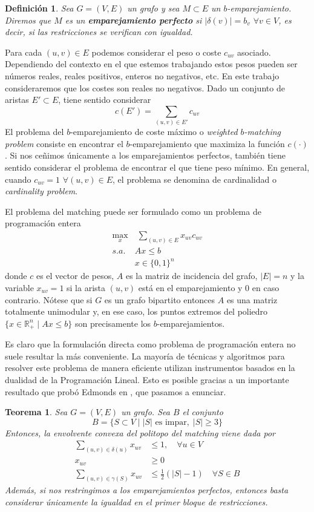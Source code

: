 \documentclass[twoside,a4paper,openright,12pt]{book}
\newtheorem{defi}{Definici\'on}[section]
\newtheorem{thm}{Teorema}[section]
\newcommand{\R}{\mathbb{R}}
\begin{document}
\begin{defi}
Sea $G=(V,E)$ un grafo y sea $M\subset E$ un $b$-emparejamiento. Diremos que $M$ es un \textbf{emparejamiento perfecto} si $|\delta(v)|=b_v$ $\forall v \in V$, es decir, si las restricciones se verifican con igualdad.
\end{defi}
Para cada $(u,v)\in E$ podemos considerar el peso o coste $c_{uv}$ asociado. Dependiendo del contexto en el que estemos trabajando estos pesos pueden ser números reales, reales positivos, enteros no negativos, etc. En este trabajo consideraremos que los costes son reales no negativos. Dado un conjunto de aristas $E'\subset E$, tiene sentido considerar
$$
c(E')=\sum_{(u,v)\in E'} c_{uv}
$$
El problema del $b$-emparejamiento de coste máximo o \textit{weighted $b$-matching problem} consiste en encontrar el $b$-emparejamiento que maximiza la función $c(\cdot)$. Si nos ceñimos únicamente a los emparejamientos perfectos, también tiene sentido considerar el problema de encontrar el que tiene peso mínimo. En general, cuando $c_{uv}=1$ $\forall (u,v)\in E$, el problema se denomina de cardinalidad o \textit{cardinality problem}.

El problema del matching puede ser formulado como un problema de programación entera
\begin{align*}
\max_{x} &\; \sum_{(u,v)\in E} x_{uv}c_{uv}  \nonumber\\ 
s.a.\;  &  Ax\leq b \\
& x\in\{0,1\}^n\nonumber
\end{align*}
donde $c$ es el vector de pesos, $A$ es la matriz de incidencia del grafo, $|E|=n$ y la variable $x_{uv}=1$ si la arista $(u,v)$ está en el emparejamiento y $0$ en caso contrario. Nótese que si $G$ es un grafo bipartito entonces $A$ es una matriz totalmente unimodular y, en ese caso, los puntos extremos del poliedro $\{x \in \R^n_+\mid Ax\leq b\}$ son precisamente los $b$-emparejamientos.

Es claro que la formulación directa como problema de programación entera no suele resultar la más conveniente. La mayoría de técnicas y algoritmos para resolver este problema de manera eficiente utilizan instrumentos basados en la dualidad de la Programación Lineal. Esto es posible gracias a un importante resultado que probó Edmonds en \cite{edmond}, que pasamos a enunciar.
\begin{thm}
Sea $G=(V,E)$ un grafo. Sea $B$ el conjunto
$$
B = \{S\subset V \mid |S| \text{ es impar},\;|S|\geq 3\}
$$
Entonces, la envolvente convexa del politopo del matching viene dada por
\begin{align*}
\sum_{(u,v)\in\delta(u)} x_{uv} &\leq 1, \quad \forall u\in V\\
x_{uv} &\geq 0\\
\sum_{(u,v)\in \gamma(S)} x_{uv}& \leq \frac{1}{2}(|S|-1)\quad \forall S \in B	
\end{align*}
Además, si nos restringimos a los emparejamientos perfectos, entonces basta considerar únicamente la igualdad en el primer bloque de restricciones.
\end{thm}
\end{document}
